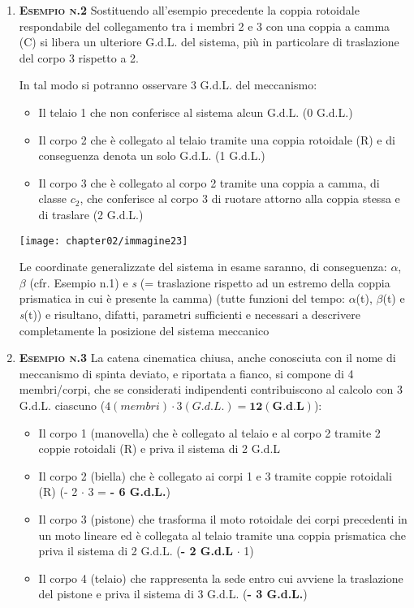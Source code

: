 \begin{enumerate}
			\item{\scshape{\bfseries Esempio n.2}}\newline
				Sostituendo all'esempio precedente la coppia rotoidale respondabile del collegamento tra i membri 2 e 3 con una coppia a camma (C) si libera un ulteriore G.d.L. del sistema, più in particolare di traslazione del corpo 3 rispetto a 2.\newline
				\begin{minipage}{.55\textwidth}
				In tal modo si potranno osservare 3 G.d.L. del meccanismo:
				\begin{itemize}
					\item Il telaio 1 che non conferisce al sistema alcun G.d.L. (0 G.d.L.)
					\item Il corpo 2 che è collegato al telaio tramite una coppia rotoidale (R) e di conseguenza denota un solo G.d.L. (1 G.d.L.)
					\item Il corpo 3 che è collegato al corpo 2 tramite una coppia a camma, di classe $c_2$, che conferisce al corpo 3 di ruotare attorno alla coppia stessa e di traslare (2 G.d.L.)
				\end{itemize}
				\end{minipage}
				\hfill
				\begin{minipage}{.45\textwidth}
					\centering
					\texttt{[image: chapter02/immagine23]}
				\end{minipage}

				Le coordinate generalizzate del sistema in esame saranno, di conseguenza:
				$\alpha$, $\beta$ (cfr. Esempio n.1) e \emph{s} (= traslazione rispetto ad un estremo della coppia prismatica in cui è presente la camma) (tutte funzioni del tempo: $\alpha$(t), $\beta$(t) e \emph{s}(t))
				e  risultano, difatti, parametri sufficienti e  necessari a descrivere completamente la posizione del sistema meccanico
		\item {\scshape{\bfseries Esempio n.3}}\newline
		La catena cinematica chiusa, anche conosciuta con il nome di meccanismo di spinta deviato, e riportata a fianco, si compone di 4 membri/corpi, che se considerati indipendenti contribuiscono al calcolo con 3 G.d.L. ciascuno ($4 (membri) \cdot 3 (G.d.L.) = \textbf{12} (\textbf{G.d.L})$):
	
		\begin{itemize}
			\item Il corpo 1 (manovella) che è collegato al telaio e al corpo 2 tramite 2 coppie rotoidali (R) e priva il sistema di 2 G.d.L
			\item Il corpo 2 (biella) che è collegato ai corpi 1 e 3 tramite coppie rotoidali (R) (- 2 $\cdot$ 3 = \textbf{- 6 G.d.L.})
			\item Il corpo 3 (pistone) che trasforma il moto rotoidale dei corpi precedenti in un moto lineare ed è collegata al telaio tramite una coppia prismatica che priva il sistema di 2 G.d.L. (\textbf{- 2 G.d.L} $\cdot$ 1)
			\item Il corpo 4 (telaio) che rappresenta la sede entro cui avviene la traslazione del pistone e priva il sistema di 3 G.d.L. (\textbf{- 3 G.d.L.})
		\end{itemize} 
		

\end{enumerate}
